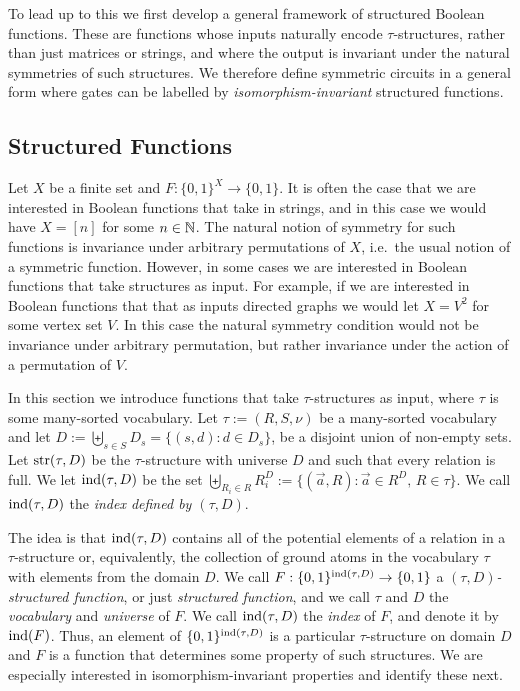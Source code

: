 \documentclass[a4paper,UKenglish]{lipics-v2018}
\begin{document}
To lead up to this we first develop a general framework of structured Boolean
functions. These are functions whose inputs naturally encode $\tau$-structures,
rather than just matrices or strings, and where the output is invariant under
the natural symmetries of such structures. We therefore define symmetric
circuits in a general form where gates can be labelled by
\emph{isomorphism-invariant} structured functions.

\subsection{Structured Functions}
Let $X$ be a finite set and $F: \{0,1\}^X \rightarrow \{0,1\}$. It is often the
case that we are interested in Boolean functions that take in strings, and in
this case we would have $X = [n]$ for some $n \in \mathbb{N}$. The natural notion of
symmetry for such functions is invariance under arbitrary permutations of $X$,
i.e.\ the usual notion of a symmetric function. However, in some cases we are
interested in Boolean functions that take structures as input. For example, if
we are interested in Boolean functions that that as inputs directed graphs we
would let $X = V^2$ for some vertex set $V$. In this case the natural symmetry
condition would not be invariance under arbitrary permutation, but rather
invariance under the action of a permutation of $V$.

In this section we introduce functions that take $\tau$-structures as input,
where $\tau$ is some many-sorted vocabulary. Let $\tau := (R, S, \nu)$ be a
many-sorted vocabulary and let $D := \biguplus_{s \in S} D_{s} = \{(s,d) : d \in
D_s\}$, be a disjoint union of non-empty sets. Let $\text{str}(\tau, D)$ be the
$\tau$-structure with universe $D$ and such that every relation is full. We let
$\text{\upshape ind} (\tau, D)$ be the set $\biguplus_{R_i\in R} R^{D}_i := \{ (\vec{a}, R) :
\vec{a} \in R^{D}, \, R \in \tau \} $. We call $\text{\upshape ind}(\tau, D)$ the \emph{index
  defined by $(\tau, D)$}.

The idea is that $\text{\upshape ind}(\tau, D)$ contains all of the potential elements of a
relation in a $\tau$-structure or, equivalently, the collection of ground atoms
in the vocabulary $\tau$ with elements from the domain $D$. We call $F :
\{0,1\}^{\text{\upshape ind}(\tau, D)} \rightarrow \{0,1\}$ a \emph{$(\tau, D)$-structured function},
or just \emph{structured function}, and we call $\tau$ and $D$ the
\emph{vocabulary} and \emph{universe} of $F$. We call $\text{\upshape ind}(\tau, D)$ the
\emph{index} of $F$, and denote it by $\text{\upshape ind}(F)$. Thus, an element of
$\{0,1\}^{\text{\upshape ind}(\tau, D)}$ is a particular $\tau$-structure on domain $D$ and $F$
is a function that determines some property of such structures. We are
especially interested in isomorphism-invariant properties and identify these
next.
\end{document}
